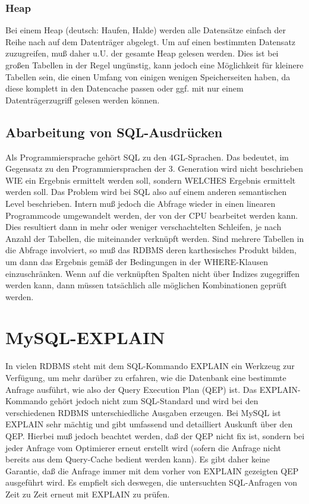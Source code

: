 \subsubsection{Heap} 
Bei einem Heap (deutsch: Haufen, Halde) werden alle Datensätze einfach der Reihe nach auf dem Datenträger abgelegt. Um auf einen bestimmten Datensatz zuzugreifen, muß daher u.U. der gesamte Heap gelesen werden. Dies ist bei großen Tabellen in der Regel ungünstig, kann jedoch eine Möglichkeit für kleinere Tabellen sein, die einen Umfang von einigen wenigen Speicherseiten haben, da diese komplett in den Datencache passen oder ggf. mit nur einem Datenträgerzugriff gelesen werden können.

\subsection{Abarbeitung von SQL-Ausdrücken}
Als Programmiersprache gehört SQL zu den 4GL-Sprachen. Das bedeutet, im Gegensatz zu den Programmiersprachen der 3. Generation wird nicht beschrieben WIE ein Ergebnis ermittelt werden soll, sondern WELCHES Ergebnis ermittelt werden soll. Das Problem wird bei SQL also auf einem anderen semantischen Level beschrieben. Intern muß jedoch die Abfrage wieder in einen linearen Programmcode umgewandelt werden, der von der CPU bearbeitet werden kann. Dies resultiert dann in mehr oder weniger verschachtelten Schleifen, je nach Anzahl der Tabellen, die miteinander verknüpft werden. Sind mehrere Tabellen in die Abfrage involviert, so muß das RDBMS deren karthesisches Produkt bilden, um dann das Ergebnis gemäß der Bedingungen in der WHERE-Klausen einzuschränken. Wenn auf die verknüpften Spalten nicht über Indizes zugegriffen werden kann, dann müssen tatsächlich alle möglichen Kombinationen geprüft werden.

\section{MySQL-EXPLAIN}
In vielen RDBMS steht mit dem SQL-Kommando EXPLAIN ein Werkzeug zur Verfügung, um mehr darüber zu erfahren, wie die Datenbank eine bestimmte Anfrage ausführt, wie also der Query Execution Plan (QEP) ist. Das EXPLAIN-Kommando gehört jedoch nicht zum SQL-Standard und wird bei den verschiedenen RDBMS unterschiedliche Ausgaben erzeugen. Bei MySQL ist EXPLAIN sehr mächtig und gibt umfassend und detailliert Auskunft über den QEP. Hierbei muß jedoch beachtet werden, daß der QEP nicht fix ist, sondern bei jeder Anfrage vom Optimierer erneut erstellt wird (sofern die Anfrage nicht bereits aus dem Query-Cache bedient werden kann). Es gibt daher keine Garantie, daß die Anfrage immer mit dem vorher von EXPLAIN gezeigten QEP ausgeführt wird. Es empfielt sich deswegen, die untersuchten SQL-Anfragen von Zeit zu Zeit erneut mit EXPLAIN zu prüfen.

